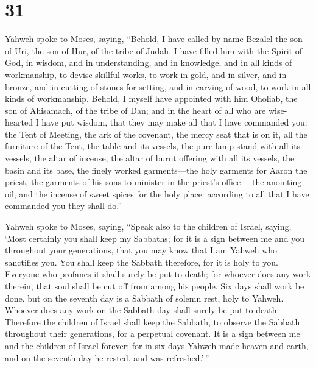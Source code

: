 \hypertarget{section-30}{%
\section{31}\label{section-30}}

 Yahweh spoke to Moses, saying,  ``Behold, I
have called by name Bezalel the son of Uri, the son of Hur, of the tribe
of Judah.  I have filled him with the Spirit of God, in
wisdom, and in understanding, and in knowledge, and in all kinds of
workmanship,  to devise skillful works, to work in gold,
and in silver, and in bronze,  and in cutting of stones
for setting, and in carving of wood, to work in all kinds of
workmanship.  Behold, I myself have appointed with him
Oholiab, the son of Ahisamach, of the tribe of Dan; and in the heart of
all who are wise-hearted I have put wisdom, that they may make all that
I have commanded you:  the Tent of Meeting, the ark of the
covenant, the mercy seat that is on it, all the furniture of the Tent,
 the table and its vessels, the pure lamp stand with all
its vessels, the altar of incense,  the altar of burnt
offering with all its vessels, the basin and its base, 
the finely worked garments---the holy garments for Aaron the priest, the
garments of his sons to minister in the priest's office---
 the anointing oil, and the incense of sweet spices for
the holy place: according to all that I have commanded you they shall
do.''

 Yahweh spoke to Moses, saying,  ``Speak
also to the children of Israel, saying, `Most certainly you shall keep
my Sabbaths; for it is a sign between me and you throughout your
generations, that you may know that I am Yahweh who sanctifies you.
 You shall keep the Sabbath therefore, for it is holy to
you. Everyone who profanes it shall surely be put to death; for whoever
does any work therein, that soul shall be cut off from among his people.
 Six days shall work be done, but on the seventh day is a
Sabbath of solemn rest, holy to Yahweh. Whoever does any work on the
Sabbath day shall surely be put to death.  Therefore the
children of Israel shall keep the Sabbath, to observe the Sabbath
throughout their generations, for a perpetual covenant. 
It is a sign between me and the children of Israel forever; for in six
days Yahweh made heaven and earth, and on the seventh day he rested, and
was refreshed.'\,''

